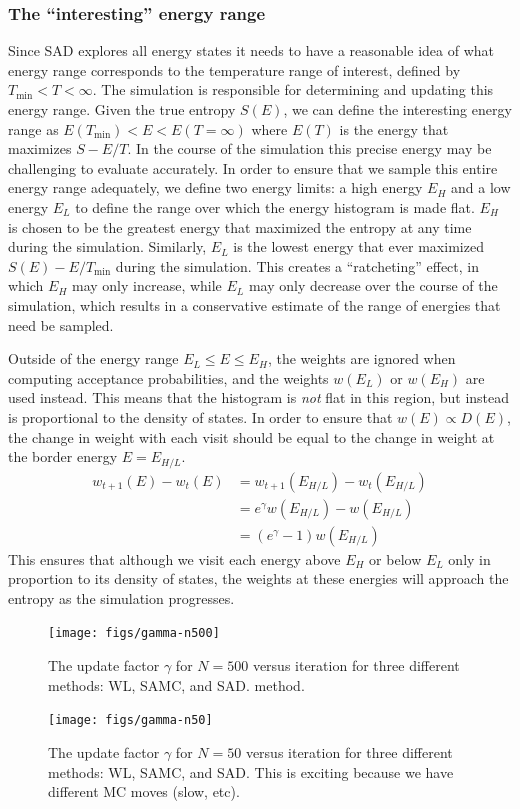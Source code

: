 \documentclass[letterpaper,twocolumn,amsmath,amssymb,pre,aps,10pt]{revtex4-1}
\begin{document}
\subsubsection{The ``interesting'' energy range}\label{sec:EHL}
Since SAD explores all energy states it needs to have a reasonable idea
of what energy range corresponds to the temperature range of interest,
defined by $T_{\min}<T<\infty$.
The
simulation is responsible for determining and updating this energy
range.
Given the true entropy $S(E)$, we can define the interesting energy
range as
  $E(T_{\min}) <E< E(T=\infty)$
where $E(T)$ is the energy that maximizes $S-E/T$.  In the course of the
simulation this precise energy may be challenging to evaluate accurately.
In order to ensure that we sample this entire energy range adequately,
we define two energy limits:  a high energy $E_H$ and a low
energy $E_L$ to define the range over which the energy histogram
is made flat. $E_H$ is chosen to be the greatest energy that
maximized the entropy at any time during the simulation.  Similarly,
$E_L$ is the lowest energy that ever maximized $S(E)-E/T_{\min}$ during
the simulation.  This creates a ``ratcheting'' effect, in which $E_H$
may only increase, while $E_L$ may only decrease over the course of the
simulation, which results in a conservative estimate of the range of
energies that need be sampled.

Outside of the energy range $E_L \le E \le E_H$, the weights are ignored
when computing acceptance probabilities, and the weights $w(E_L)$ or
$w(E_H)$ are used instead.  This means that the histogram is \emph{not}
flat in this region, but instead is proportional to the density of
states.  In order to ensure that $w(E) \propto D(E)$, the change in
weight with each visit should be equal to the change in weight at
the border energy $E=E_{H/L}$.
\begin{align}
  w_{t+1}(E)-w_t(E) &= w_{t+1}(E_{H/L}) -w_t(E_{H/L}) \\
    &= e^\gamma w(E_{H/L}) - w(E_{H/L}) \\
    &= (e^\gamma-1) w(E_{H/L})
\end{align}
This ensures that although we visit each energy above $E_H$ or
below $E_L$ only
in proportion to its density of states, the weights at these energies
will approach the entropy as the simulation progresses.

\begin{figure}
  \texttt{[image: figs/gamma-n500]}
  \caption{The update factor $\gamma$ for $N=500$ versus iteration for three
    different methods: WL, SAMC, and SAD.
    method.}\label{fig:gamma-vs-t}
\end{figure}
\begin{figure}
  \texttt{[image: figs/gamma-n50]}
  \caption{The update factor $\gamma$ for $N=50$ versus iteration for three
    different methods: WL, SAMC, and SAD.  This is exciting because we
    have different MC moves (slow, etc).}
\end{figure}
\end{document}
